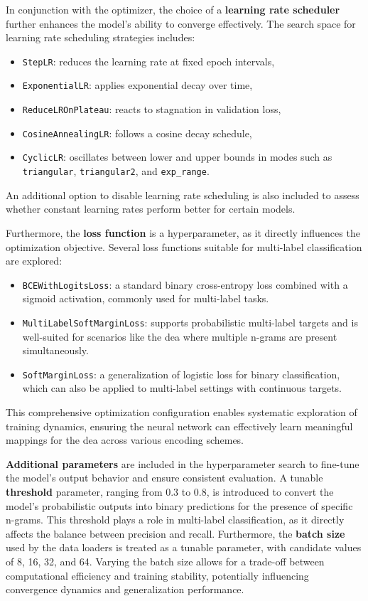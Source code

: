 In conjunction with the optimizer, the choice of a \textbf{learning rate scheduler} further enhances the model's ability to converge effectively.
The search space for learning rate scheduling strategies includes:
\begin{itemize}
    \item \texttt{StepLR}: reduces the learning rate at fixed epoch intervals,
    \item \texttt{ExponentialLR}: applies exponential decay over time,
    \item \texttt{ReduceLROnPlateau}: reacts to stagnation in validation loss,
    \item \texttt{CosineAnnealingLR}: follows a cosine decay schedule,
    \item \texttt{CyclicLR}: oscillates between lower and upper bounds in modes such as \texttt{triangular}, \texttt{triangular2}, and \texttt{exp\_range}.
\end{itemize}
An additional option to disable learning rate scheduling is also included to assess whether constant learning rates perform better for certain models.

Furthermore, the \textbf{loss function} is a hyperparameter, as it directly influences the optimization objective.
Several loss functions suitable for multi-label classification are explored:
\begin{itemize}
    \item \texttt{BCEWithLogitsLoss}: a standard binary cross-entropy loss combined with a sigmoid activation, commonly used for multi-label tasks.
    \item \texttt{MultiLabelSoftMarginLoss}: supports probabilistic multi-label targets and is well-suited for scenarios like the \ac{dea} where multiple n-grams are present simultaneously.
    \item \texttt{SoftMarginLoss}: a generalization of logistic loss for binary classification, which can also be applied to multi-label settings with continuous targets.
\end{itemize}

This comprehensive optimization configuration enables systematic exploration of training dynamics, ensuring the neural network can effectively learn meaningful mappings for the \ac{dea} across various encoding schemes.

\textbf{Additional parameters} are included in the hyperparameter search to fine-tune the model's output behavior and ensure consistent evaluation.
A tunable \textbf{threshold} parameter, ranging from 0.3 to 0.8, is introduced to convert the model’s probabilistic outputs into binary predictions for the presence of specific n-grams.
This threshold plays a  role in multi-label classification, as it directly affects the balance between precision and recall.
Furthermore, the \textbf{batch size} used by the data loaders is treated as a tunable parameter, with candidate values of 8, 16, 32, and 64. Varying the batch size allows for a trade-off between computational efficiency and training stability, potentially influencing convergence dynamics and generalization performance.


